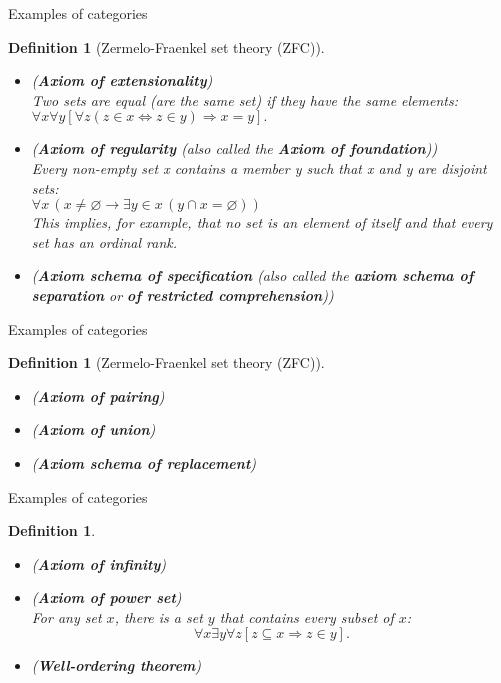 \documentclass[dvipdfmx,10pt,notheorems]{beamer}
\newtheorem{definition}[theorem]{Definition}
\renewcommand{\#}{^\sharp}
\begin{document}
	
	\begin{frame}{Examples of categories}
			\begin{definition}[Zermelo-Fraenkel set theory (ZFC)]
				\begin{itemize}
						\item ({\bf Axiom of extensionality})\\
						Two sets are equal (are the same set) if they have the same elements:\\
						$\forall x\forall y[\forall z(z\in x\Leftrightarrow z\in y)\Rightarrow x=y].$
						\item ({\bf Axiom of regularity} (also called the {\bf Axiom of foundation}))\\
						Every non-empty set x contains a member y such that x and y are disjoint sets:\\
						$\forall x\,(x\neq \varnothing \rightarrow \exists y\in x\,(y\cap x=\varnothing ))$\\
						This implies, for example, that no set is an element of itself and that every set has an ordinal rank.
						\item ({\bf Axiom schema of specification}
						(also called the {\bf axiom schema of separation} or {\bf of restricted comprehension}))
				\end{itemize}
			\end{definition}
	\end{frame}



	\begin{frame}{Examples of categories}
			\begin{definition}[Zermelo-Fraenkel set theory (ZFC)]
				\begin{itemize}
						\item ({\bf Axiom of pairing})\\
						\item ({\bf Axiom of union})\\
						\item ({\bf Axiom schema of replacement})\\
				\end{itemize}
			\end{definition}
	\end{frame}



	\begin{frame}{Examples of categories}
			\begin{definition}
					\begin{itemize}
						\item ({\bf Axiom of infinity})\\
						\item ({\bf Axiom of power set})\\
						For any set $x$, there is a set $y$ that contains every subset of $x$:
						$$\forall x\exists y\forall z[z\subseteq x\Rightarrow z\in y].$$
						\item ({\bf Well-ordering theorem})\\
					\end{itemize}
			\end{definition}
	\end{frame}
\end{document}
